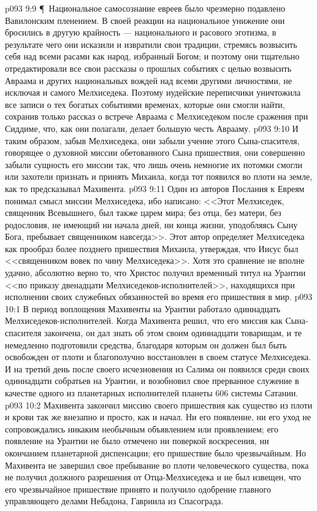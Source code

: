 \vs p093 9:9 \P\ Национальное самосознание евреев было чрезмерно подавлено Вавилонским пленением. В своей реакции на национальное унижение они бросились в другую крайность --- национального и расового эготизма, в результате чего они исказили и извратили свои традиции, стремясь возвысить себя над всеми расами как народ, избранный Богом; и поэтому они тщательно отредактировали все свои рассказы о прошлых событиях с целью возвысить Авраама и других национальных вождей над всеми другими личностями, не исключая и самого Мелхиседека. Поэтому иудейские переписчики уничтожила все записи о тех богатых событиями временах, которые они смогли найти, сохранив только рассказ о встрече Авраама с Мелхиседеком после сражения при Сиддиме, что, как они полагали, делает большую честь Аврааму.
\vs p093 9:10 И таким образом, забыв Мелхиседека, они забыли учение этого Сына\hyp{}спасителя, говорящее о духовной миссии обетованного Сына пришествия, они совершенно забыли сущность его миссии так, что лишь очень немногие их потомки смогли или захотели признать и принять Михаила, когда тот появился во плоти на земле, как то предсказывал Махивента.
\vs p093 9:11 Один из авторов Послания к Евреям понимал смысл миссии Мелхиседека, ибо написано: <<Этот Мелхиседек, священник Всевышнего, был также царем мира; без отца, без матери, без родословия, не имеющий ни начала дней, ни конца жизни, уподобляясь Сыну Бога, пребывает священником навсегда>>. Этот автор определяет Мелхиседека как прообраз более позднего пришествия Михаила, утверждая, что Иисус был <<священником вовек по чину Мелхиседека>>. Хотя это сравнение не вполне удачно, абсолютно верно то, что Христос получил временный титул на Урантии <<по приказу двенадцати Мелхиседеков\hyp{}исполнителей>>, находящихся при исполнении своих служебных обязанностей во время его пришествия в мир.
\vs p093 10:1 В период воплощения Махивенты на Урантии работало одиннадцать Мелхиседеков\hyp{}исполнителей. Когда Махивента решил, что его миссия как Сына\hyp{}спасителя закончена, он дал знать об этом своим одиннадцати товарищам, и те немедленно подготовили средства, благодаря которым он должен был быть освобожден от плоти и благополучно восстановлен в своем статусе Мелхиседека. И на третий день после своего исчезновения из Салима он появился среди своих одиннадцати собратьев на Урантии, и возобновил свое прерванное служение в качестве одного из планетарных исполнителей планеты 606 системы Сатании.
\vs p093 10:2 Махивента закончил миссию своего пришествия как существо из плоти и крови так же внезапно и просто, как и начал. Ни его появление, ни его уход не сопровождались никаким необычным объявлением или проявлением; его появление на Урантии не было отмечено ни поверкой воскресения, ни окончанием планетарной диспенсации; его пришествие было чрезвычайным. Но Махивента не завершил свое пребывание во плоти человеческого существа, пока не получил должного разрешения от Отца\hyp{}Мелхиседека и не был извещен, что его чрезвычайное пришествие принято и получило одобрение главного управляющего делами Небадона, Гавриила из Спасограда.
